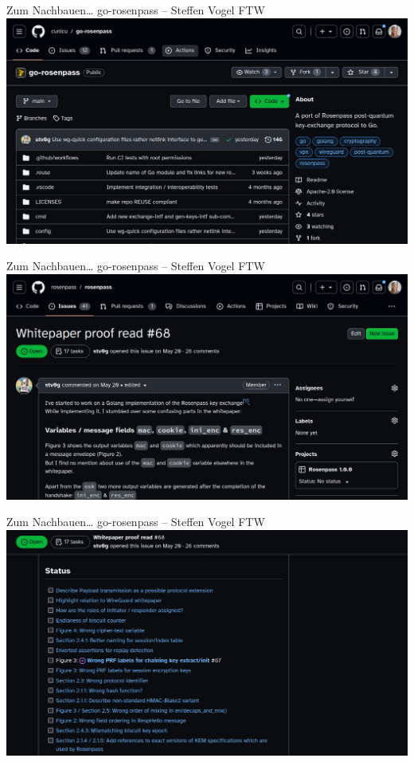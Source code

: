 \documentclass{rosenpass-beamer}
\begin{document}
\begin{frame}{Zum Nachbauen… go-rosenpass – Steffen Vogel FTW}
  \includegraphics[height=.9\textheight]{assets/2023-09-02-go-rosenpass-gh.png}
\end{frame}

\begin{frame}{Zum Nachbauen… go-rosenpass – Steffen Vogel FTW}
  \includegraphics[height=.9\textheight]{assets/2023-09-02-steffen-proof-read.png}
\end{frame}

\begin{frame}{Zum Nachbauen… go-rosenpass – Steffen Vogel FTW}
  \includegraphics[height=.9\textheight]{assets/2023-09-02-steffen-proof-read-issues.png}
\end{frame}
\end{document}
